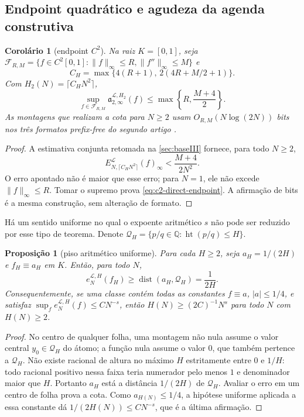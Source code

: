 \documentclass[11pt,a4paper]{article}
\newtheorem{proposition}[theorem]{Proposição}
\newtheorem{corollary}[theorem]{Corolário}
\theoremstyle{definition}
\theoremstyle{remark}
\newcommand{\Library}{\mathcal{L}}
\newcommand{\height}{\operatorname{ht}}
\begin{document}
\subsection{Endpoint quadrático e agudeza da agenda construtiva}

\begin{corollary}[endpoint $C^2$]
\label{cor:c2-direct-endpoint}
Na raiz $K=[0,1]$, seja
$\mathcal F_{R,M}=\{f\in C^2[0,1]:\|f\|_\infty\le R,
\|f''\|_\infty\le M\}$ e
\[
 C_H=\max\{4(R+1),\,2(4R+M/2+1)\}.
\]
Com $H_2(N)=\lceil C_HN^2\rceil$,
\begin{equation}
 \sup_{f\in\mathcal F_{R,M}}
 \mathfrak a_{2,\infty}^{\Library,H_2}(f)
 \le\max\left\{R,\frac{M+4}{2}\right\}.
 \label{eq:c2-direct-endpoint}
\end{equation}
As montagens que realizam a cota para $N\ge2$ usam
$O_{R,M}(N\log(2N))$ bits nos três formatos prefix-free do
segundo artigo \citep{oliveiraII}.
\end{corollary}

\begin{proof}
A estimativa conjunta retomada na \cref{sec:baseIII} fornece, para todo $N\ge2$,
\[
 E_{N,\lceil C_HN^2\rceil}^{\Library}(f)_\infty
 <\frac{M+4}{2N^2}.
\]
O erro apontado não é maior que esse erro; para $N=1$, ele não excede
$\|f\|_\infty\le R$. Tomar o supremo prova
\eqref{eq:c2-direct-endpoint}. A afirmação de bits é a mesma construção,
sem alteração de formato.
\end{proof}

Há um sentido uniforme no qual o expoente aritmético $s$ não pode ser
reduzido por esse tipo de teorema. Denote
$\mathcal Q_H=\{p/q\in\mathbb Q:\height(p/q)\le H\}$.

\begin{proposition}[piso aritmético uniforme]
\label{prop:arithmetic-floor}
Para cada $H\ge2$, seja $a_H=1/(2H)$ e $f_H\equiv a_H$ em $K$. Então, para
todo $N$,
\begin{equation}
 e_N^{\Library,H}(f_H)
 \ge\operatorname{dist}(a_H,\mathcal Q_H)
 =\frac1{2H}.
 \label{eq:arithmetic-floor}
\end{equation}
Consequentemente, se uma classe contém todas as constantes
$f\equiv a$, $|a|\le1/4$, e satisfaz
$\sup_f e_N^{\Library,H}(f)\le C N^{-s}$, então
$H(N)\ge(2C)^{-1}N^s$ para todo $N$ com $H(N)\ge2$.
\end{proposition}

\begin{proof}
No centro de qualquer folha, uma montagem não nula assume o valor central
$y_0\in\mathcal Q_H$ do átomo; a função nula assume o valor $0$, que também
pertence a $\mathcal Q_H$. Não existe racional de altura no máximo $H$
estritamente entre $0$ e $1/H$: todo racional positivo nessa faixa teria
numerador pelo menos $1$ e denominador maior que $H$. Portanto
$a_H$ está a distância $1/(2H)$ de $\mathcal Q_H$. Avaliar o erro em um
centro de folha prova a cota. Como $a_{H(N)}\le1/4$, a hipótese uniforme
aplicada a essa constante dá
$1/(2H(N))\le CN^{-s}$, que é a última afirmação.
\end{proof}
\end{document}
